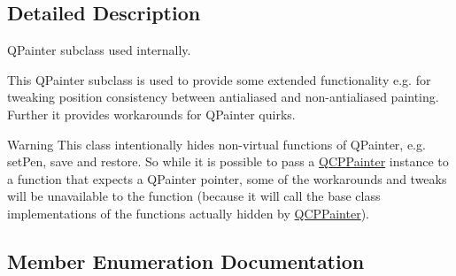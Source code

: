 \subsection{Detailed Description}
Q\+Painter subclass used internally. 

This Q\+Painter subclass is used to provide some extended functionality e.\+g. for tweaking position consistency between antialiased and non-\/antialiased painting. Further it provides workarounds for Q\+Painter quirks.

\begin{DoxyWarning}{Warning}
This class intentionally hides non-\/virtual functions of Q\+Painter, e.\+g. set\+Pen, save and restore. So while it is possible to pass a \hyperlink{class_q_c_p_painter}{Q\+C\+P\+Painter} instance to a function that expects a Q\+Painter pointer, some of the workarounds and tweaks will be unavailable to the function (because it will call the base class implementations of the functions actually hidden by \hyperlink{class_q_c_p_painter}{Q\+C\+P\+Painter}). 
\end{DoxyWarning}


\subsection{Member Enumeration Documentation}
